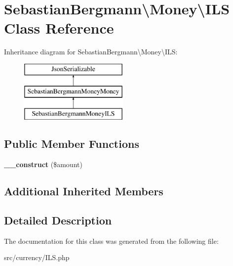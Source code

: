 \hypertarget{classSebastianBergmann_1_1Money_1_1ILS}{}\section{Sebastian\+Bergmann\textbackslash{}Money\textbackslash{}I\+L\+S Class Reference}
\label{classSebastianBergmann_1_1Money_1_1ILS}
Inheritance diagram for Sebastian\+Bergmann\textbackslash{}Money\textbackslash{}I\+L\+S\+:\begin{figure}[H]
\begin{center}
\leavevmode
\includegraphics[height=3.000000cm]{classSebastianBergmann_1_1Money_1_1ILS}
\end{center}
\end{figure}
\subsection*{Public Member Functions}
\begin{DoxyCompactItemize}
\item 
\hypertarget{classSebastianBergmann_1_1Money_1_1ILS_ade3ad7b111e366c3f1a4f1aabd9ec84a}{}{\bfseries \+\_\+\+\_\+construct} (\$amount)\label{classSebastianBergmann_1_1Money_1_1ILS_ade3ad7b111e366c3f1a4f1aabd9ec84a}

\end{DoxyCompactItemize}
\subsection*{Additional Inherited Members}


\subsection{Detailed Description}


The documentation for this class was generated from the following file\+:\begin{DoxyCompactItemize}
\item 
src/currency/I\+L\+S.\+php\end{DoxyCompactItemize}
